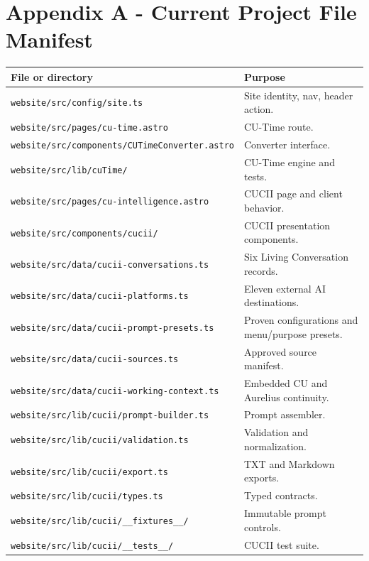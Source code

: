 \documentclass[11pt,letterpaper]{article}
\newcommand{\filepath}[1]{\nolinkurl{#1}}
\begin{document}
\section{Appendix A - Current Project File Manifest}

\begin{longtable}{L{2.75in}L{3.65in}}
\toprule
\textbf{File or directory} & \textbf{Purpose} \\
\midrule
\filepath{website/src/config/site.ts} & Site identity, nav, header action. \\
\filepath{website/src/pages/cu-time.astro} & CU-Time route. \\
\filepath{website/src/components/CUTimeConverter.astro} & Converter interface. \\
\filepath{website/src/lib/cuTime/} & CU-Time engine and tests. \\
\filepath{website/src/pages/cu-intelligence.astro} & CUCII page and client behavior. \\
\filepath{website/src/components/cucii/} & CUCII presentation components. \\
\filepath{website/src/data/cucii-conversations.ts} & Six Living Conversation records. \\
\filepath{website/src/data/cucii-platforms.ts} & Eleven external AI destinations. \\
\filepath{website/src/data/cucii-prompt-presets.ts} & Proven configurations and menu/purpose presets. \\
\filepath{website/src/data/cucii-sources.ts} & Approved source manifest. \\
\filepath{website/src/data/cucii-working-context.ts} & Embedded CU and Aurelius continuity. \\
\filepath{website/src/lib/cucii/prompt-builder.ts} & Prompt assembler. \\
\filepath{website/src/lib/cucii/validation.ts} & Validation and normalization. \\
\filepath{website/src/lib/cucii/export.ts} & TXT and Markdown exports. \\
\filepath{website/src/lib/cucii/types.ts} & Typed contracts. \\
\filepath{website/src/lib/cucii/__fixtures__/} & Immutable prompt controls. \\
\filepath{website/src/lib/cucii/__tests__/} & CUCII test suite. \\
\bottomrule
\end{longtable}
\end{document}
